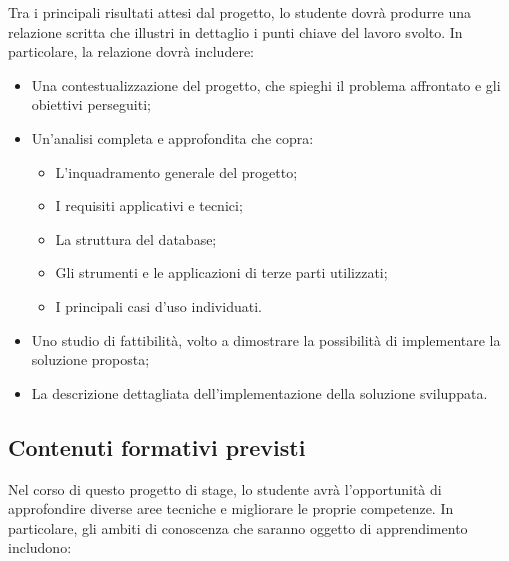 Tra i principali risultati attesi dal progetto, lo studente dovrà produrre una relazione scritta che illustri in dettaglio i punti chiave del lavoro svolto. In particolare, la relazione dovrà includere:

\begin{itemize}
    \item Una contestualizzazione del progetto, che spieghi il problema affrontato e gli obiettivi perseguiti;
    \item Un'analisi completa e approfondita che copra:
    \begin{itemize}
        \item L'inquadramento generale del progetto;
        \item I requisiti applicativi e tecnici;
        \item La struttura del database;
        \item Gli strumenti e le applicazioni di terze parti utilizzati;
        \item I principali casi d'uso individuati.
    \end{itemize}
    \item Uno studio di fattibilità, volto a dimostrare la possibilità di implementare la soluzione proposta;
    \item La descrizione dettagliata dell'implementazione della soluzione sviluppata.
\end{itemize}

\subsection{Contenuti formativi previsti}

Nel corso di questo progetto di stage, lo studente avrà l'opportunità di approfondire diverse aree tecniche e migliorare le proprie competenze. In particolare, gli ambiti di conoscenza che saranno oggetto di apprendimento includono:


